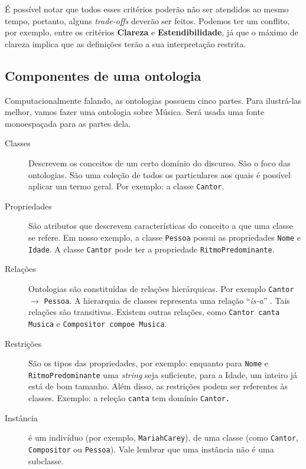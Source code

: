 É possível notar que todos esses critérios poderão não ser atendidos ao mesmo tempo, portanto, alguns \textit{trade-offs} deverão ser feitos.
Podemos ter um conflito, por exemplo, entre os critérios \textbf{Clareza} e \textbf{Estendibilidade}, já que o máximo de clareza implica que as definições terão a sua interpretação restrita.

\subsection{Componentes de uma ontologia}

Computacionalmente falando, as ontologias possuem cinco partes. Para ilustrá-las melhor, vamos fazer uma ontologia sobre Música. Será usada uma fonte monoespaçada para as partes dela.

\begin{description}
	\item[Classes] Descrevem os conceitos de um certo domínio do discurso. São o foco das ontologias. São uma coleção de todos os particulares aos quais é possível aplicar um termo geral. Por exemplo: a classe \texttt{Cantor}.
	\item[Propriedades] São atributos que descrevem características do conceito a que uma classe se refere. Em nosso exemplo, a classe \texttt{Pessoa} possui as propriedades \texttt{Nome} e \texttt{Idade}. A classe \texttt{Cantor} pode ter a propriedade \texttt{RitmoPredominante}.
	\item[Relações] Ontologias são constituídas de relações hierárquicas. Por exemplo \texttt{Cantor} $ \to $ \texttt{Pes\-so\-a}. A hierarquia de classes representa uma relação “\textit{is-a}” \citep{ontoFranca}. Tais relações são transitivas. Existem outras relações, como \texttt{Cantor canta Musica} e \texttt{Compositor compoe Musica}.
	\item[Restrições] São os tipos das propriedades, por exemplo: enquanto para \texttt{Nome} e \\ \texttt{RitmoPredominante} uma \textit{string} seja suficiente, para a Idade, um inteiro já está de bom tamanho. Além disso, as restrições podem ser referentes às classes. Exemplo: a releção \texttt{canta} tem domínio \texttt{Cantor.}
	\item[Instância] é um indivíduo (por exemplo, \texttt{MariahCarey}), de uma classe (como \texttt{Cantor}, \texttt{Com\-po\-si\-tor} ou \texttt{Pessoa}). Vale lembrar que uma instância não é uma subclasse.
\end{description}

